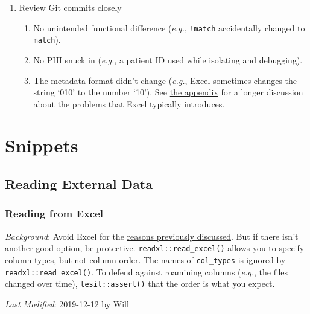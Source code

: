 \documentclass[
]{book}
\providecommand{\tightlist}{%
  \setlength{\itemsep}{0pt}\setlength{\parskip}{0pt}}
\begin{document}
\begin{enumerate}
\def\labelenumi{\arabic{enumi}.}
\item
  Review Git commits closely

  \begin{enumerate}
  \def\labelenumii{\arabic{enumii}.}
  \tightlist
  \item
    No unintended functional difference (\emph{e.g.}, \texttt{!match} accidentally changed to \texttt{match}).
  \item
    No PHI snuck in (\emph{e.g.}, a patient ID used while isolating and debugging).
  \item
    The metadata format didn't change (\emph{e.g.}, Excel sometimes changes the string `010' to the number `10'). See \protect\hyperlink{snippets-correspondence-excel}{the appendix} for a longer discussion about the problems that Excel typically introduces.
  \end{enumerate}
\end{enumerate}

\hypertarget{snippets}{%
\chapter{Snippets}\label{snippets}}

\hypertarget{snippets-reading}{%
\section{Reading External Data}\label{snippets-reading}}

\hypertarget{snippets-reading-excel}{%
\subsection{Reading from Excel}\label{snippets-reading-excel}}

\emph{Background}: Avoid Excel for the \href{\%7B\#data-containers-avoid}{reasons previously discussed}. But if there isn't another good option, be protective. \href{https://readxl.tidyverse.org/reference/read_excel.html}{\texttt{readxl::read\_excel()}} allows you to specify column types, but not column order. The names of \texttt{col\_types} is ignored by \texttt{readxl::read\_excel()}. To defend against roamining columns (\emph{e.g.}, the files changed over time), \texttt{tesit::assert()} that the order is what you expect.

\emph{Last Modified}: 2019-12-12 by Will
\end{document}
